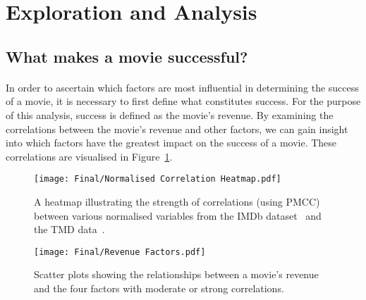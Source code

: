 \newpage
\section{Exploration and Analysis}
    \subsection{What makes a movie successful?}
        \begin{multicols}{2}
            \paragraph{}
                In order to ascertain which factors are most influential in determining the
                    success of a movie, it is necessary to first define what constitutes success.
                For the purpose of this analysis, success is defined as the movie's revenue.
                By examining the correlations between the movie's revenue and other factors, we
                    can gain insight into which factors have the greatest impact on the success of
                    a movie.
                These correlations are visualised in Figure~\ref{fig-heatmap}.

                \begin{figure}[H]
                    \centering
                    \texttt{[image: Final/Normalised Correlation Heatmap.pdf]}
                    \caption{
                        A heatmap illustrating the strength of correlations (using PMCC) between various normalised
                        variables from the IMDb dataset~\cite{data:IMDb} and the TMD
                        data~\cite{data:TMD}.
                    }\label{fig-heatmap}
                \end{figure}

                \begin{figure}[H]
                    \centering
                    \texttt{[image: Final/Revenue Factors.pdf]}
                    \caption{
                        Scatter plots showing the relationships between a movie's revenue and the four
                        factors with moderate or strong correlations.
                    }\label{fig-revenue-factors}
                \end{figure}


\end{multicols}
